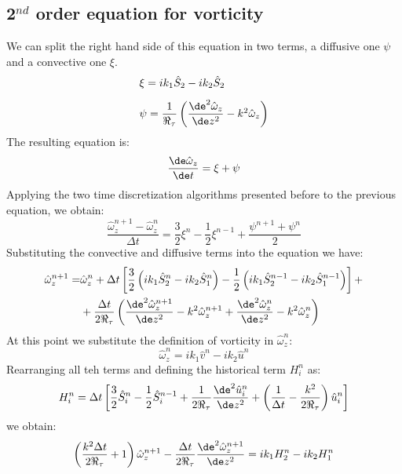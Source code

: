 \subsection{2$^{nd}$ order equation for vorticity}
We can split the right hand side of this equation in two terms, a diffusive one $\psi$ and a convective one $\xi$.
\[
\begin{array}{l}
\xi=ik_1\hat S_2-ik_2\hat S_2\\[2ex]
\psi=\dfrac{1}{\Re_\tau}\left( \dfrac{\de^2 \hat \omega_z}{\de z^2}-k^2\hat\omega_z\right)
\end{array}
\]
The resulting equation is:
\[
\frac{\de \hat\omega_z}{\de t}=\xi+\psi
\]
Applying the two time discretization algorithms presented before to the previous equation, we obtain:
\[
\frac{\hat\omega_z^{n+1}-\hat\omega_z^n}{\Delta t}=\frac 3 2 \xi^n-\frac 1 2 \xi^{n-1}+\frac{\psi^{n+1}+\psi^n}{2}
\]
Substituting the convective and diffusive terms into the equation we have:
\[
\begin{split}
\hat\omega_z^{n+1}=&\hat\omega_z^n+\Delta t \left[ \frac 3 2 \left( i k_1\hat S_2^n -i k_2\hat S_1^n \right)-\frac{1}{2}\left( ik_1\hat S_2^{n-1}-ik_2\hat S_1^{n-1}  \right) \right]+\\
&+\frac{\Delta t}{2\Re_\tau}\left( \frac{\de^2 \hat\omega_z^{n+1}}{\de z^2}-k^2\hat\omega_z^{n+1} +\frac{\de^2 \hat\omega_z^{n}}{\de z^2}-k^2\hat\omega_z^{n} \right)
\end{split}
\]
At this point we substitute the definition of vorticity in $\hat\omega_z^n$:
\[
\hat\omega_z^n=ik_1\hat v^n-ik_2\hat u^n
\]
Rearranging all teh terms and defining the historical term $H_i^n$ as:
\[
H_i^n=\Delta t\left[\frac 3 2 \hat S_i^n-\frac 12 \hat S_i^{n-1}+\frac{1}{2\Re_\tau}\frac{\de^2 \hat u_i^n}{\de z^2}+\left(\frac{1}{\Delta t}-\frac{k^2}{2\Re_\tau} \right)\hat u_i^n  \right]
\]
we obtain:
\begin{equation}
\left(\frac{k^2\Delta t}{2\Re_\tau}+1 \right)\hat\omega_z^{n+1}-\frac{\Delta t}{2\Re_\tau}\frac{\de^2 \hat\omega_z^{n+1}}{\de z^2}=ik_1H_2^n-ik_2H_1^n
\end{equation}

